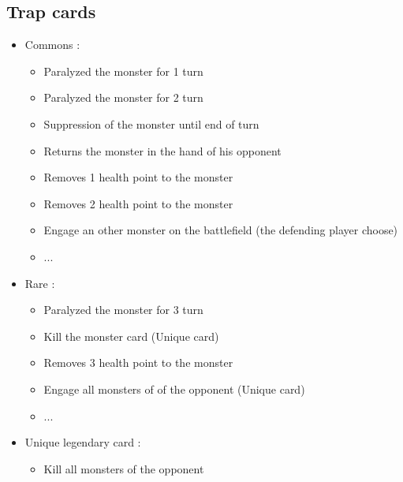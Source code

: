 \documentclass[a4paper,12pt]{book}
\begin{document}
\subsection{Trap cards}
\begin{itemize}
	\item Commons :
	\begin{itemize}
		\item Paralyzed the monster for 1 turn
		\item Paralyzed the monster for 2 turn
		\item Suppression of the monster until end of turn
		\item Returns the monster in the hand of his opponent
		\item Removes 1 health point to the monster
		\item Removes 2 health point to the monster
		\item Engage an other monster on the battlefield (the defending player choose)
		\item ...
	\end{itemize}
	\item Rare :
	\begin{itemize}
		\item Paralyzed the monster for 3 turn
		\item Kill the monster card (Unique card)
		\item Removes 3 health point to the monster
		\item Engage all monsters of of the opponent (Unique card)
		\item ...
	\end{itemize}
	\item Unique legendary card :
	\begin{itemize}
		\item Kill all monsters of the opponent
	\end{itemize}
\end{itemize}
\end{document}
